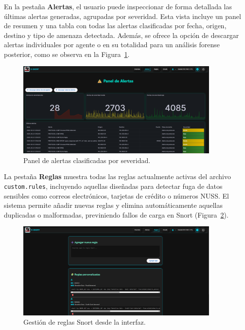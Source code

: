 \documentclass[11pt,a4paper,twoside]{report}
\begin{document}
\newpage

En la pestaña \textbf{Alertas}, el usuario puede inspeccionar de forma detallada las últimas alertas generadas, agrupadas por severidad. Esta vista incluye un panel de resumen y una tabla con todas las alertas clasificadas por fecha, origen, destino y tipo de amenaza detectada. Además, se ofrece la opción de descargar alertas individuales por agente o en su totalidad para un análisis forense posterior, como se observa en la Figura~\ref{fig:alertas-rsnort}.

\begin{figure}[H]
	\centering
	\includegraphics[width=0.9\textwidth]{configuracion/3.png}
	\caption{Panel de alertas clasificadas por severidad.}
	\label{fig:alertas-rsnort}
\end{figure}

La pestaña \textbf{Reglas} muestra todas las reglas actualmente activas del archivo \texttt{custom.rules}, incluyendo aquellas diseñadas para detectar fuga de datos sensibles como correos electrónicos, tarjetas de crédito o números NUSS. El sistema permite añadir nuevas reglas y elimina automáticamente aquellas duplicadas o malformadas, previniendo fallos de carga en Snort (Figura~\ref{fig:reglas-rsnort}).

\begin{figure}[H]
	\centering
	\includegraphics[width=0.9\textwidth]{configuracion/4.png}
	\caption{Gestión de reglas Snort desde la interfaz.}
	\label{fig:reglas-rsnort}
\end{figure}
\end{document}
